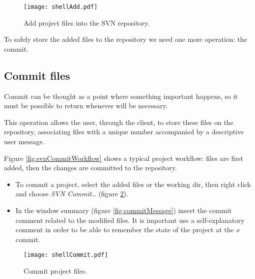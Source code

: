 \begin{figure}[htbp]
    \centering
    \texttt{[image: shellAdd.pdf]}
    \caption{Add project files into the SVN repository.}
    \label{fig:svnAdd}
\end{figure}

To safely store the added files to the repository we need one more operation: the commit.










\subsection{Commit files}
\label{subsection:CommitFiles}

Commit can be thought as a point where something important happens, so it must be possible to return whenever will be necessary.

This operation allows the user, through the client, to store these files on the repository, associating files with a unique number accompanied by a descriptive user message.

Figure \ref{fig:svnCommitWorkflow} shows a typical project workflow: files are first added, then the changes are committed to the repository.\\



\begin{itemize}
    \item To commit a project, select the added files or the working dir, then right click and choose \textit{SVN Commit\ldots} (figure \ref{fig:shellCommit}).
    
    \item In the window summary (figure \ref{fig:commitMessage}) insert the commit comment related to the modified files. It is important use a self-explanatory comment in order to be able to remember the state of the project at the $x$ commit.
    
    
\end{itemize}

\begin{figure}[ht!]
    \centering
    \texttt{[image: shellCommit.pdf]}
    \caption{Commit project files.}
    \label{fig:shellCommit}
\end{figure}



